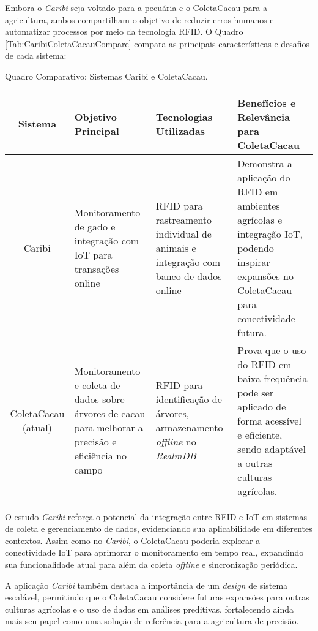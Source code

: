 Embora o \textit{Caribi} seja voltado para a pecuária e o ColetaCacau para a agricultura, ambos compartilham o objetivo de reduzir erros humanos e automatizar processos por meio da tecnologia RFID. O Quadro \ref{Tab:CaribiColetaCacauCompare} compara as principais características e desafios de cada sistema:

\begin{quadro}[!htb]
    \centering
    \footnotesize
    \caption{Quadro Comparativo: Sistemas Caribi e ColetaCacau.}
	\begin{tabular}{|c|p{3cm}|p{3cm}|p{5cm}|}
	   \hline
	   \textbf{Sistema} & \centering\textbf{Objetivo Principal} & \textbf{Tecnologias Utilizadas} & \textbf{Benefícios e Relevância para ColetaCacau}\\
	   \hline
            Caribi & Monitoramento de gado e integração com IoT para transações online & RFID para rastreamento individual de animais e integração com banco de dados online & Demonstra a aplicação do RFID em ambientes agrícolas e integração IoT, podendo inspirar expansões no ColetaCacau para conectividade futura. \\ 
        \hline
            ColetaCacau (atual) & Monitoramento e coleta de dados sobre árvores de cacau para melhorar a precisão e eficiência no campo & RFID para identificação de árvores, armazenamento \textit{offline} no \textit{RealmDB} & Prova que o uso do RFID em baixa frequência pode ser aplicado de forma acessível e eficiente, sendo adaptável a outras culturas agrícolas. \\ 
        \hline
	\end{tabular}
    \label{Tab:CaribiColetaCacauCompare}
\end{quadro}

O estudo \textit{Caribi} reforça o potencial da integração entre RFID e IoT em sistemas de coleta e gerenciamento de dados, evidenciando sua aplicabilidade em diferentes contextos. Assim como no \textit{Caribi}, o ColetaCacau poderia explorar a conectividade IoT para aprimorar o monitoramento em tempo real, expandindo sua funcionalidade atual para além da coleta \textit{offline} e sincronização periódica.

A aplicação \textit{Caribi} também destaca a importância de um \textit{design} de sistema escalável, permitindo que o ColetaCacau considere futuras expansões para outras culturas agrícolas e o uso de dados em análises preditivas, fortalecendo ainda mais seu papel como uma solução de referência para a agricultura de precisão.


